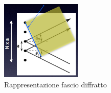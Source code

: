 \begin{figure}
    \centering
    \vspace{-5pt}
    \includegraphics[width=0.34\textwidth]{Immagini/Capitolo3/Reticolo_fascio_diffratto.PNG}
    \caption*{Rappresentazione fascio diffratto}
    \vspace{-5pt}
\end{figure}

